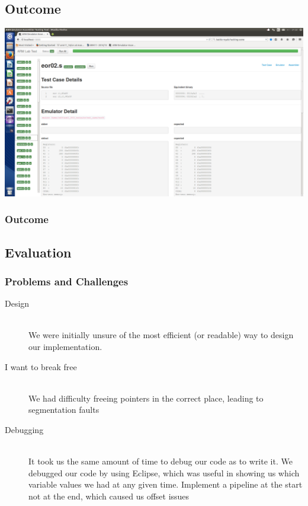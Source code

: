 \documentclass{beamer}
\begin{document}
\subsection{Outcome}
\begin{frame}
\includegraphics[width=0.9\linewidth]{Images/EmulatorTestCases.png}
\frametitle{Outcome}




\end{frame}

\subsection{Evaluation}


\begin{frame}
\frametitle{Problems and Challenges}

\begin{description}
\item[Design]\hfill\\
	We were initially unsure of the most efficient (or readable) way to design our implementation.
	
\item[I want to break free]\hfill\\
	We had difficulty freeing pointers in the correct place, leading to segmentation faults
\item[Debugging]\hfill\\
    It took us the same amount of time to debug our code as to write it. We debugged our code by using Eclipse, which was useful in showing us which variable values we had at any given time. Implement a pipeline at the start not at the end, which caused us offset issues   


\end{description}


\end{frame}
\end{document}
